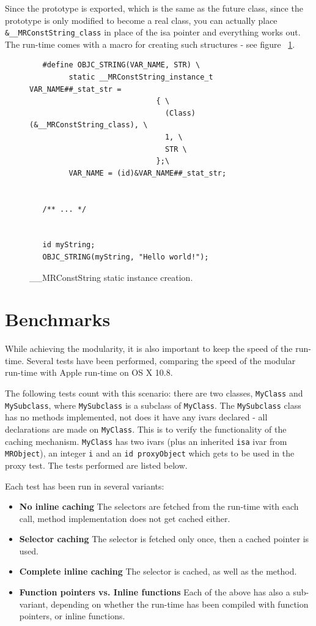 Since the prototype is exported, which is the same as the future class, since the prototype is only modified to become a real class, you can actually place \verb=&__MRConstString_class= in place of the isa pointer and everything works out. The run-time comes with a macro for creating such structures - see figure ~\ref{fig:mr_const_str_creation}.

\begin{figure}[H]
  \begin{verbatim}
   #define OBJC_STRING(VAR_NAME, STR) \
         static __MRConstString_instance_t VAR_NAME##_stat_str = 
                             { \
                               (Class)(&__MRConstString_class), \
                               1, \
                               STR \
                             };\
         VAR_NAME = (id)&VAR_NAME##_stat_str;


   /** ... */
   
 
   id myString;
   OBJC_STRING(myString, "Hello world!");
   \end{verbatim}
  \centering{}
  \caption{\_\_MRConstString static instance creation.}
  \label{fig:mr_const_str_creation}
\end{figure}

\section{Benchmarks}

While achieving the modularity, it is also important to keep the speed of the run-time. Several tests have been performed, comparing the speed of the modular run-time with Apple run-time on OS X 10.8.

The following tests count with this scenario: there are two classes, \verb=MyClass= and \verb=MySubclass=, where \verb=MySubclass= is a subclass of \verb=MyClass=. The \verb=MySubclass= class has no methods implemented, not does it have any ivars declared - all declarations are made on \verb=MyClass=. This is to verify the functionality of the caching mechanism. \verb=MyClass= has two ivars (plus an inherited \verb=isa= ivar from \verb=MRObject=), an integer \verb=i= and an \verb=id proxyObject= which gets to be used in the proxy test. The tests performed are listed below.

Each test has been run in several variants:

\begin{itemize}
	\item{\bf{No inline caching}} The selectors are fetched from the run-time with each call, method implementation does not get cached either.
	\item{\bf{Selector caching}} The selector is fetched only once, then a cached pointer is used.
	\item{\bf{Complete inline caching}} The selector is cached, as well as the method.
	\item{\bf{Function pointers vs. Inline functions}} Each of the above has also a sub-variant, depending on whether the run-time has been compiled with function pointers, or inline functions.
\end{itemize}

